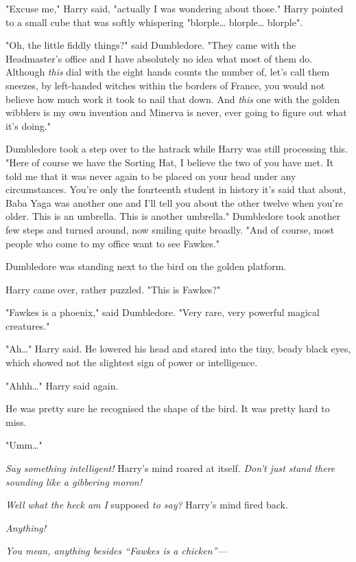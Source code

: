 "Excuse me," Harry said, "actually I was wondering about those." Harry pointed 
to a small cube that was softly whispering "blorple{\ldots} blorple{\ldots} 
blorple".

"Oh, the little fiddly things?" said Dumbledore. "They came with the 
Headmaster's office and I have absolutely no idea what most of them do. 
Although \emph{this} dial with the eight hands counts the number of, let's call 
them sneezes, by left-handed witches within the borders of France, you would 
not believe how much work it took to nail that down. And \emph{this} one with 
the golden wibblers is my own invention and Minerva is never, ever going to 
figure out what it's doing."

Dumbledore took a step over to the hatrack while Harry was still processing 
this. "Here of course we have the Sorting Hat, I believe the two of you have 
met. It told me that it was never again to be placed on your head under any 
circumstances. You're only the fourteenth student in history it's said that 
about, Baba Yaga was another one and I'll tell you about the other twelve when 
you're older. This is an umbrella. This is another umbrella." Dumbledore took 
another few steps and turned around, now smiling quite broadly. "And of course, 
most people who come to my office want to see Fawkes."

Dumbledore was standing next to the bird on the golden platform.

Harry came over, rather puzzled. "This is Fawkes?"

"Fawkes is a phoenix," said Dumbledore. "Very rare, very powerful magical 
creatures."

"Ah{\ldots}" Harry said. He lowered his head and stared into the tiny, beady 
black eyes, which showed not the slightest sign of power or intelligence.

"Ahhh{\ldots}" Harry said again.

He was pretty sure he recognised the shape of the bird. It was pretty hard to 
miss.

"Umm{\ldots}"

\emph{Say something intelligent!} Harry's mind roared at itself. \emph{Don't 
just stand there sounding like a gibbering moron!}

\emph{Well what the heck am I} supposed \emph{to say?} Harry's mind fired back.

\emph{Anything!}

\emph{You mean, anything besides ``Fawkes is a chicken''---}

